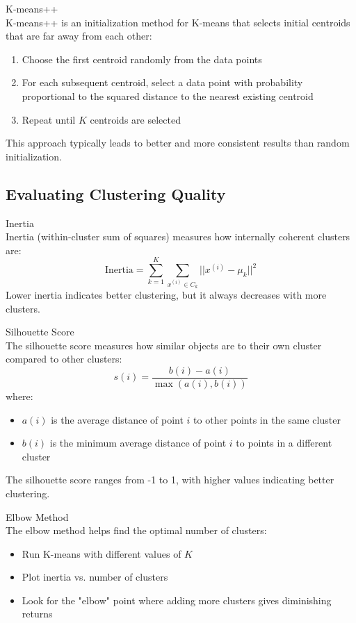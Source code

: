 \begin{definition}{K-means++}\\
K-means++ is an initialization method for K-means that selects initial centroids that are far away from each other:
\begin{enumerate}
    \item Choose the first centroid randomly from the data points
    \item For each subsequent centroid, select a data point with probability proportional to the squared distance to the nearest existing centroid
    \item Repeat until $K$ centroids are selected
\end{enumerate}
This approach typically leads to better and more consistent results than random initialization.
\end{definition}

\subsection{Evaluating Clustering Quality}

\begin{definition}{Inertia}\\
Inertia (within-cluster sum of squares) measures how internally coherent clusters are:
\[\text{Inertia} = \sum_{k=1}^{K} \sum_{x^{(i)} \in C_k} ||x^{(i)} - \mu_k||^2\]
Lower inertia indicates better clustering, but it always decreases with more clusters.
\end{definition}

\begin{definition}{Silhouette Score}\\
The silhouette score measures how similar objects are to their own cluster compared to other clusters:
\[s(i) = \frac{b(i) - a(i)}{\max(a(i), b(i))}\]
where:
\begin{itemize}
    \item $a(i)$ is the average distance of point $i$ to other points in the same cluster
    \item $b(i)$ is the minimum average distance of point $i$ to points in a different cluster
\end{itemize}
The silhouette score ranges from -1 to 1, with higher values indicating better clustering.
\end{definition}

\begin{concept}{Elbow Method}\\
The elbow method helps find the optimal number of clusters:
\begin{itemize}
    \item Run K-means with different values of $K$
    \item Plot inertia vs. number of clusters
    \item Look for the "elbow" point where adding more clusters gives diminishing returns
\end{itemize}
\end{concept}

